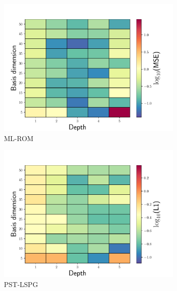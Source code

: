 \documentclass[3p,computermodern,10pt]{elsarticle}
\begin{document}
\begin{figure}
\begin{center}
\begin{subfigure}[t]{0.32\textwidth}
\includegraphics[trim={0cm 0cm 0cm 0cm},clip,width=1.0\linewidth]{code/burgers/synapse_models/basis_study/results/MSE_ML.pdf}
\caption{ML-ROM}
\end{subfigure}
\begin{subfigure}[t]{0.32\textwidth}
\includegraphics[trim={0cm 0cm 0cm 0cm},clip,width=1.0\linewidth]{code/burgers/synapse_models/basis_study/results/L1_LS.pdf}
\caption{PST-LSPG}
\end{subfigure}
\begin{subfigure}[t]{0.32\textwidth}

\end{subfigure}
\end{center}
\end{figure}
\end{document}
